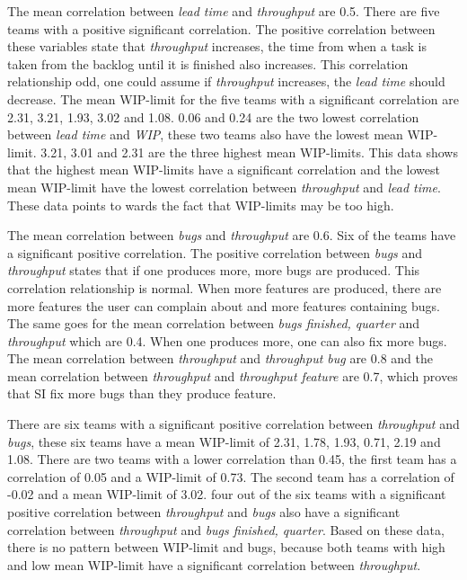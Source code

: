 \documentclass[UKenglish]{ifimaster}  %
\begin{document}
The mean correlation between \textit{lead time} and \textit{throughput} are 0.5. There are five teams with a positive significant correlation. The positive correlation between these variables state that \textit{throughput} increases, the time from when a task is taken from the backlog until it is finished also increases. This correlation relationship odd, one could assume if \textit{throughput} increases, the \textit{lead time} should decrease. The mean WIP-limit for the five teams with a significant correlation are 2.31, 3.21, 1.93, 3.02 and 1.08. 0.06 and 0.24 are the two lowest correlation between \textit{lead time} and \textit{WIP}, these two teams also have the lowest mean WIP-limit. 3.21, 3.01 and 2.31 are the three highest mean WIP-limits. This data shows that the highest mean WIP-limits have a significant correlation and the lowest mean WIP-limit have the lowest correlation between \textit{throughput} and \textit{lead time}. These data points to wards the fact that WIP-limits may be too high. 

The mean correlation between \textit{bugs} and \textit{throughput} are 0.6. Six of the teams have a significant positive correlation. The positive correlation between \textit{bugs} and \textit{throughput} states that if one produces more, more bugs are produced. This correlation relationship is normal. When more features are produced, there are more features the user can complain about and more features containing bugs.  The same goes for the mean correlation between \textit{bugs finished, quarter} and \textit{throughput} which are 0.4. When one produces more, one can also fix more bugs. The mean correlation between \textit{throughput} and \textit{throughput bug} are 0.8 and the mean correlation between \textit{throughput} and \textit{throughput feature} are 0.7, which proves that SI fix more bugs than they produce feature.  

There are six teams with a significant positive correlation between \textit{throughput} and \textit{bugs}, these six teams have a mean WIP-limit of 2.31, 1.78, 1.93, 0.71, 2.19 and 1.08. There are two teams with a lower correlation than 0.45, the first team has a correlation of 0.05 and a WIP-limit of 0.73. The second team has a correlation of -0.02 and a mean WIP-limit of 3.02. four out of the six teams with a significant positive correlation between \textit{throughput} and \textit{bugs} also have a significant correlation between \textit{throughput} and \textit{bugs finished, quarter}. Based on these data, there is no pattern between WIP-limit and bugs, because both teams with high and low mean WIP-limit have a significant correlation between \textit{throughput}. 
\end{document}
